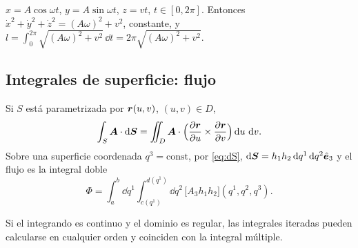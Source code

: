 \begin{ejemplo}[Hélice]
\label{ej:helice-longitud}
$x=A\cos\omega t$, $y=A\sin\omega t$, $z=vt$, $t\in[0,2\pi]$. Entonces
$\dot x^{2}+\dot y^{2}+\dot z^{2}=(A\omega)^{2}+v^{2}$, constante, y
$l=\int_{0}^{2\pi}\sqrt{(A\omega)^{2}+v^{2}}\,\dd t=2\pi\sqrt{(A\omega)^{2}+v^{2}}$.
\end{ejemplo}

\subsection{Integrales de superficie: flujo}

\begin{proposicion}
\label{prop:flujo}
Si $S$ está parametrizada por $\bm{r}(u,v)$, $(u,v)\in D$,
\begin{equation}
  \int_{S}\bm{A}\cdot\mathop{}\!\mathrm{d}\bm{S}=\iint_{D}\bm{A}\cdot\Bigl(\frac{\partial \bm{r}}{\partial u}\times\frac{\partial \bm{r}}{\partial v}\Bigr)\mathop{}\!\mathrm{d} u\,\mathop{}\!\mathrm{d} v .
\end{equation}
Sobre una superficie coordenada $q^{3}=\text{const}$, por \eqref{eq:dS},
$\mathop{}\!\mathrm{d}\bm{S}=h_{1}h_{2}\mathop{}\!\mathrm{d} q^{1}\mathop{}\!\mathrm{d} q^{2}\hat{\bm{e}}_{3}$ y el flujo es la integral doble
\begin{equation}
  \Phi=\int_{a}^{b}\dd q^{1}\int_{c(q^{1})}^{d(q^{1})}\dd q^{2}\,\bigl[A_{3}h_{1}h_{2}\bigr](q^{1},q^{2},q^{3}).
\end{equation}
\end{proposicion}

\begin{teorema}[Fubini]
Si el integrando es continuo y el dominio es regular, las integrales
iteradas pueden calcularse en cualquier orden y coinciden con la integral
múltiple.
\end{teorema}


